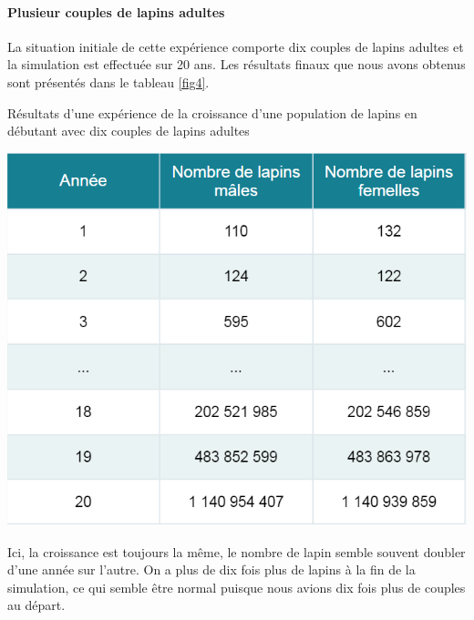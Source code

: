 \documentclass[12pt]{article}
\begin{document}
    \paragraph{Plusieur couples de lapins adultes}\hspace{0.5cm}
    \newline
    \par La situation initiale de cette expérience comporte dix couples de lapins adultes et la simulation est effectuée sur 20 ans. Les résultats finaux que nous avons obtenus sont présentés dans le tableau \ref{fig4}.
    \newpage
    \begin{table}[!h]
	    \centering
	    \caption{Résultats d'une expérience de la croissance d'une population de lapins en débutant avec dix couples de lapins adultes}
        \includegraphics[scale = 0.7]{Photos/lapin10.png}
	    \label{fig4}
	\end{table}
    \par
    Ici, la croissance est toujours la même, le nombre de lapin semble souvent doubler d'une année sur l'autre. On a plus de dix fois plus de lapins à la fin de la simulation, ce qui semble être normal puisque nous avions dix fois plus de couples au départ.\\
    \par
\end{document}
